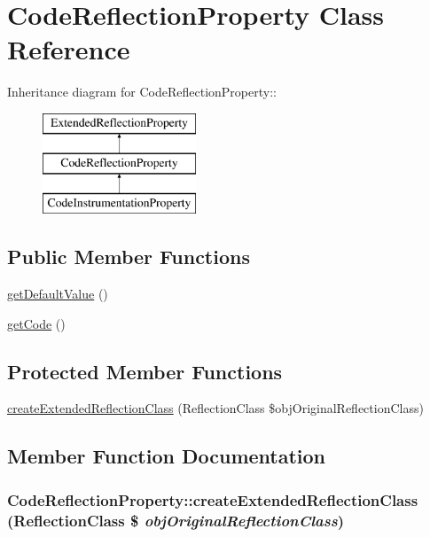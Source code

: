 \hypertarget{class_code_reflection_property}{
\section{CodeReflectionProperty Class Reference}
\label{class_code_reflection_property}
}
Inheritance diagram for CodeReflectionProperty::\begin{figure}[H]
\begin{center}
\leavevmode
\includegraphics[height=3cm]{class_code_reflection_property}
\end{center}
\end{figure}
\subsection*{Public Member Functions}
\begin{CompactItemize}
\item 
\hyperlink{class_code_reflection_property_6f0cc1d1c9d11ca1494665d52b8322d0}{getDefaultValue} ()
\item 
\hyperlink{class_code_reflection_property_cb9c0d02fbb50cfe8d8b023b5b07a25c}{getCode} ()
\end{CompactItemize}
\subsection*{Protected Member Functions}
\begin{CompactItemize}
\item 
\hyperlink{class_code_reflection_property_ada66f395b16622378963471801f11ad}{createExtendedReflectionClass} (ReflectionClass \$objOriginalReflectionClass)
\end{CompactItemize}


\subsection{Member Function Documentation}
\hypertarget{class_code_reflection_property_ada66f395b16622378963471801f11ad}{
\subsubsection[{createExtendedReflectionClass}]{\setlength{\rightskip}{0pt plus 5cm}CodeReflectionProperty::createExtendedReflectionClass (ReflectionClass \$ {\em objOriginalReflectionClass})}}
\label{class_code_reflection_property_ada66f395b16622378963471801f11ad}


